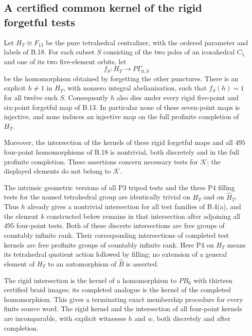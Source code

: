 \subsection{A certified common kernel of the rigid forgetful tests}

Let $H_T\cong F_{13}$ be the pure tetrahedral centralizer,
with the ordered parameter and labels of B.18.
For each subset $S$ consisting of the two poles of an
icosahedral $C_5$ and one of its two five-element orbits,
let
\[
 f_S:H_T\longrightarrow P\Gamma_{0,S}
\]
be the homomorphism obtained by forgetting the other punctures.
There is an explicit $h\ne1$ in $H_T$, with nonzero
integral abelianization, such that $f_S(h)=1$ for all twelve
such $S$.  Consequently $h$ also dies under every rigid
five-point and six-point forgetful map of B.13.
In particular none of these seven-point maps is injective,
and none induces an injective map on the full profinite
completion of $H_T$.

Moreover, the intersection of the kernels of these rigid
forgetful maps and all $495$ four-point homomorphisms of
B.18 is nontrivial, both discretely and in the full profinite
completion.  These assertions concern necessary tests for
$\mathcal K$; the displayed elements do not belong to
$\mathcal K$.

The intrinsic geometric versions of all P3 tripod tests
and the three P4 filling tests for the named tetrahedral
group are identically trivial on $H_T$ and on
$\widehat H_T$.  Thus $h$ already gives a nontrivial
intersection for all test families of B.4(a), and the
element $k$ constructed below remains in that intersection
after adjoining all $495$ four-point tests.
Both of these discrete intersections are free groups of
countably infinite rank.  Their corresponding intersections
of completed test kernels are free profinite groups of
countably infinite rank.
Here P4 on $H_T$ means its tetrahedral quotient action
followed by filling; no extension of a general element
of $H_T$ to an automorphism of $\widehat B$ is asserted.

The rigid intersection is the kernel of a homomorphism to $PB_6$
with thirteen certified braid images; its completed analogue
is the kernel of the completed homomorphism.
This gives a terminating exact membership procedure for every
finite source word.  The rigid kernel and the intersection of
all four-point kernels are incomparable, with explicit witnesses
$h$ and $w$, both discretely and after completion.

